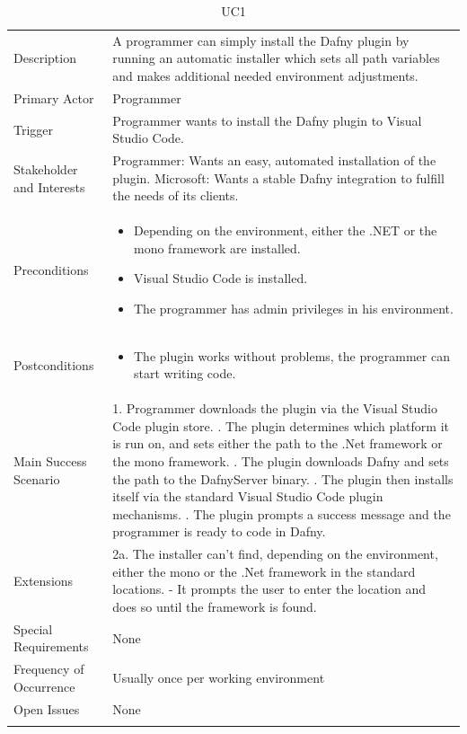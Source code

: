 \begin{longtable}{l | p{} }
	Description & A programmer can simply install the Dafny plugin by running an automatic installer which sets all path variables and makes additional needed environment adjustments.\\ 
	Primary Actor & Programmer\\ 
	Trigger & Programmer wants to install the Dafny plugin to Visual Studio Code.\\ 
	Stakeholder and Interests & Programmer: Wants an easy, automated installation of the plugin. \newline Microsoft: Wants a stable Dafny integration to fulfill the needs of its clients.\\ 
	Preconditions &\begin{itemize}
		\item Depending on the environment, either the .NET or the mono framework are installed.
		\item Visual Studio Code is installed.
		\item The programmer has admin privileges in his environment.
	\end{itemize}\\ 
	Postconditions & 
	\begin{itemize}
		\item The plugin works without problems, the programmer can start writing code.
	\end{itemize} \\ 
	Main Success Scenario & 
	1. Programmer downloads the plugin via the Visual Studio Code plugin store. \newline
	2. The plugin determines which platform it is run on, and sets either the path to the .Net framework or the mono framework. \newline
	3. The plugin downloads Dafny and sets the path to the DafnyServer binary. \newline
	4. The plugin then installs itself via the standard Visual Studio Code plugin mechanisms. \newline
	5. The plugin prompts a success message and the programmer is ready to code in Dafny.\\
	Extensions & 
	2a. The installer can't find, depending on the environment, either the mono or the .Net framework in the standard locations. \newline 
	- It prompts the user to enter the location and does so until the framework is found. \\ 
	Special Requirements & None\\ 
	Frequency of Occurrence & Usually once per working environment\\ 
	Open Issues & None \\ 
	\caption{UC1}
\end{longtable}

